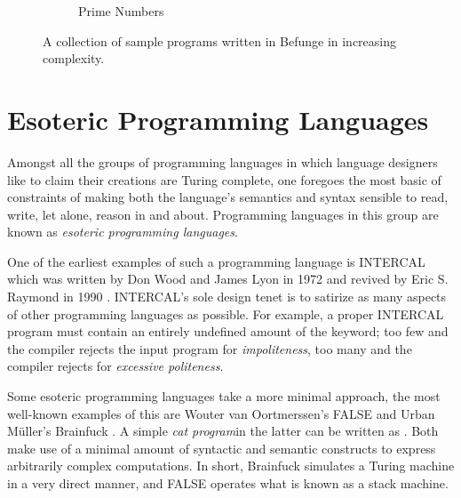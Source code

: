 \documentclass[sigconf,nonacm,screen,review,balance=false]{acmart}
\begin{document}
\begin{figure*}
\begin{adjustbox}{center}
\begin{subfigure}{0.55\textwidth}
      \caption{Prime Numbers}
      \label{fig:example-prime}
    \end{subfigure}
  \end{adjustbox}
  \caption{A collection of sample programs written in Befunge in increasing complexity.}
  \label{fig:examples}
\end{figure*}

\section{Esoteric Programming Languages}
\label{sec:eso-langs}

Amongst all the groups of programming languages in which language designers like
to claim their creations are Turing complete, one foregoes the most basic of
constraints of making both the language's semantics and syntax sensible to
read, write, let alone, reason in and about. Programming languages in this
group are known as \emph{esoteric programming languages}\cite
{fuller2008software,mateas2005darkly}.

One of the earliest examples of such a programming language is INTERCAL which
was written by Don Wood and James Lyon in 1972 and revived by Eric S. Raymond
in 1990 \cite{intercal}. INTERCAL's sole design tenet is to satirize as many
aspects of other programming languages as possible. For example, a proper
INTERCAL program must contain an entirely undefined amount of the
 keyword; too few and the compiler rejects the input program
 for \emph{impoliteness}, too many and the compiler rejects for \emph
 {excessive politeness}.

Some esoteric programming languages take a more minimal approach, the most
well-known examples of this are Wouter van Oortmerssen's FALSE \cite{false} and
Urban Müller's Brainfuck \cite{brainfuck}. A simple \emph
{cat program}\footnotemark in the latter can be written as
\brainfuck{,+[-.,+]}. Both make use of a minimal amount of syntactic and
 semantic constructs to express arbitrarily complex computations. In short,
 Brainfuck simulates a Turing machine in a very direct manner, and FALSE
 operates what is known as a stack machine.

\end{document}
